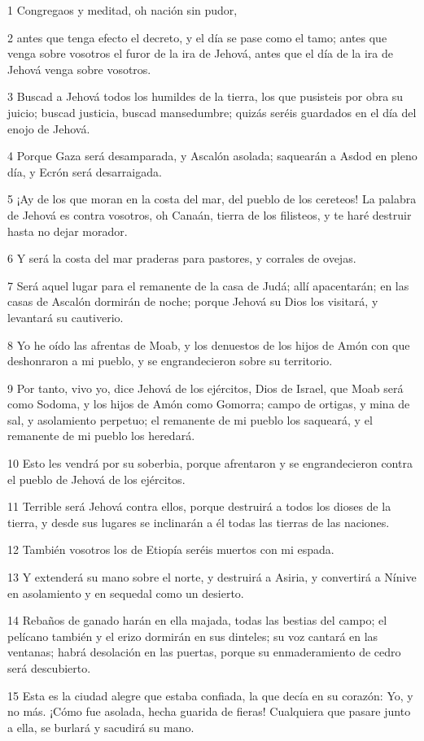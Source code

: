 \par 1 Congregaos y meditad, oh nación sin pudor,
\par 2 antes que tenga efecto el decreto, y el día se pase como el tamo; antes que venga sobre vosotros el furor de la ira de Jehová, antes que el día de la ira de Jehová venga sobre vosotros.
\par 3 Buscad a Jehová todos los humildes de la tierra, los que pusisteis por obra su juicio; buscad justicia, buscad mansedumbre; quizás seréis guardados en el día del enojo de Jehová.
\par 4 Porque Gaza será desamparada, y Ascalón asolada; saquearán a Asdod en pleno día, y Ecrón será desarraigada.
\par 5 ¡Ay de los que moran en la costa del mar, del pueblo de los cereteos! La palabra de Jehová es contra vosotros, oh Canaán, tierra de los filisteos,  y te haré destruir hasta no dejar morador.
\par 6 Y será la costa del mar praderas para pastores, y corrales de ovejas.
\par 7 Será aquel lugar para el remanente de la casa de Judá; allí apacentarán; en las casas de Ascalón dormirán de noche; porque Jehová su Dios los visitará, y levantará su cautiverio.
\par 8 Yo he oído las afrentas de Moab,  y los denuestos de los hijos de Amón con que deshonraron a mi pueblo, y se engrandecieron sobre su territorio.
\par 9 Por tanto, vivo yo, dice Jehová de los ejércitos, Dios de Israel, que Moab será como Sodoma, y los hijos de Amón como Gomorra; campo de ortigas, y mina de sal, y asolamiento perpetuo; el remanente de mi pueblo los saqueará, y el remanente de mi pueblo los heredará.
\par 10 Esto les vendrá por su soberbia, porque afrentaron y se engrandecieron contra el pueblo de Jehová de los ejércitos.
\par 11 Terrible será Jehová contra ellos, porque destruirá a todos los dioses de la tierra, y desde sus lugares se inclinarán a él todas las tierras de las naciones.
\par 12 También vosotros los de Etiopía seréis muertos con mi espada.
\par 13 Y extenderá su mano sobre el norte, y destruirá a Asiria, y convertirá a Nínive en asolamiento y en sequedal como un desierto.
\par 14 Rebaños de ganado harán en ella majada, todas las bestias del campo; el pelícano también y el erizo dormirán en sus dinteles; su voz cantará en las ventanas; habrá desolación en las puertas, porque su enmaderamiento de cedro será descubierto.
\par 15 Esta es la ciudad alegre que estaba confiada, la que decía en su corazón: Yo, y no más. ¡Cómo fue asolada, hecha guarida de fieras! Cualquiera que pasare junto a ella, se burlará y sacudirá su mano.


